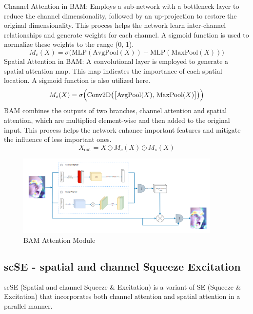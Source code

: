 \documentclass[pdflatex,sn-mathphys-num]{sn-jnl}%
\theoremstyle{thmstyleone}%
\theoremstyle{thmstyletwo}%
\theoremstyle{thmstylethree}%
\begin{document}
Channel Attention in BAM: Employs a sub-network with a bottleneck layer to reduce the channel dimensionality, followed by an up-projection to restore the original dimensionality. This process helps the network learn inter-channel relationships and generate weights for each channel. A sigmoid function is used to normalize these weights to the range (0, 1).
\begin{equation}\label{eq:cbam-channel}
M_c(X) = \sigma\bigl(\mathrm{MLP}(\mathrm{AvgPool}(X)) + \mathrm{MLP}(\mathrm{MaxPool}(X))\bigr)
\end{equation}
Spatial Attention in BAM: A convolutional layer is employed to generate a spatial attention map. This map indicates the importance of each spatial location. A sigmoid function is also utilized here.
\begin{equation}\label{eq:cbam-spatial}
M_s(X) = \sigma\Bigl(\mathrm{Conv2D}\bigl(\bigl[\mathrm{AvgPool}(X),\,\mathrm{MaxPool}(X)\bigr]\bigr)\Bigr)
\end{equation}
BAM combines the outputs of two branches, channel attention and spatial attention, which are multiplied element-wise and then added to the original input. This process helps the network enhance important features and mitigate the influence of less important ones.
\begin{equation}\label{eq:cbam-out}
X_{\mathrm{out}} = X \odot M_c(X) \odot M_s(X)
\end{equation}
\begin{figure}[h]
  \centering
  \includegraphics[width=0.9\textwidth]{Figures/BAM2.png}
   \caption{BAM Attention Module}
  \label{fig:hinh-anh-7}
\end{figure}

\subsection{scSE - spatial and channel Squeeze Excitation}
scSE (Spatial and channel Squeeze \& Excitation) \cite{b9} is a variant of SE (Squeeze \& Excitation) that incorporates both channel attention and spatial attention in a parallel manner.
\end{document}
